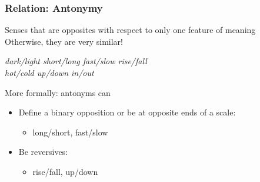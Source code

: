 \documentclass[13.5pt,aspecratio=169, xcolor=dvipsnames]{beamer}
\begin{document}
                    \begin{frame}
                        \onehalfspacing
                            \frametitle{Relation: Antonymy}
                            {\large
                            Senses that are opposites with respect to only one feature of meaning \\

                            \bigskip
                            Otherwise, they are very similar!

                            \textit{
                            \hspace{1.3em} dark/light \hspace{1.3em} short/long \hspace{1.3em} fast/slow \hspace{1.3em} rise/fall \\
                            \hspace{1.6em} hot/cold \hspace{1.3em} up/down \hspace{1.3em} in/out }
                            
                            \begin{block}{More formally: antonyms can}
                                \begin{itemize}
                                    \item Define a binary opposition or be at opposite ends of a scale: \\
                                    \begin{itemize}
                                        \item long/short, fast/slow 
                                    \end{itemize}
                                \item Be reversives: 
                                \begin{itemize}
                                \item rise/fall, up/down
                                \end{itemize}
                            \end{itemize}
                            \end{block}
                            }
                        \end{frame}
\end{document}
